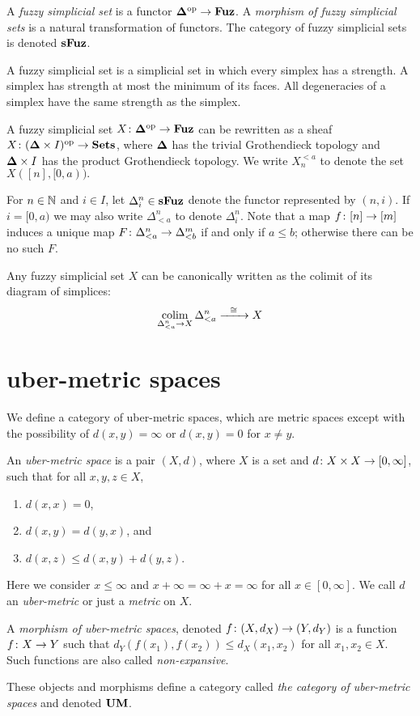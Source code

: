 \documentclass{amsart}
\def\UM{{\bf UM}}
\def\bD{{\bf \Delta}}
\def\Fuz{{\bf Fuz}}
\def\sFuz{{\bf sFuz}}
\begin{document}
\begin{definition}

A {\em fuzzy simplicial set} is a functor $\bD\op\to\Fuz$.  A {\em morphism of fuzzy simplicial sets} is a natural transformation of functors.   The category of fuzzy simplicial sets is denoted $\sFuz$.

\end{definition}

A fuzzy simplicial set is a simplicial set in which every simplex has a strength.  A simplex has strength at most the minimum of its faces.  All degeneracies of a simplex have the same strength as the simplex.

A fuzzy simplicial set $X\taking\bD\op\to\Fuz$ can be rewritten as a sheaf $X\taking(\bD\cross I)\op\to\Sets$, where $\bD$ has the trivial Grothendieck topology and $\bD\cross I$ has the product Grothendieck topology.  We write $X_n^{<a}$ to denote the set $X([n],[0,a)).$

For $n\in{\mathbb N}$ and $i\in I$, let $\Delta^n_i\in\sFuz$ denote the functor represented by $(n,i)$.  If $i=[0,a)$  we may also write $\Delta^n_{<a}$ to denote $\Delta^n_i$.  Note that a map $f\colon[n]\rightarrow[m]$ induces a unique map $F\colon\Delta^n_{<a}\rightarrow\Delta^m_{<b}$ if and only if $a\leq b$; otherwise there can be no such $F$.

Any fuzzy simplicial set $X$ can be canonically written as the colimit of its diagram of simplices: $$\mathop{\textnormal{colim}}_{\Delta^n_{<a}\rightarrow X}\Delta^n_{<a}\xrightarrow{\ \ \cong\ \ } X$$


\section{uber-metric spaces}

We define a category of uber-metric spaces, which are metric spaces except with the possibility of $d(x,y)=\infty$ or $d(x,y)=0$ for $x\neq y$.

\begin{definition}

An {\em uber-metric space} is a pair $(X,d)$, where $X$ is a set and $d\colon X\times X\rightarrow [0,\infty]$, such that for all $x,y,z\in X$, \begin{enumerate}\item $d(x,x)=0$,\item $d(x,y)=d(y,x)$, and\item $d(x,z)\leq d(x,y)+d(y,z)$.\end{enumerate}  Here we consider $x\leq\infty$ and $x+\infty=\infty+x=\infty$ for all $x\in [0,\infty]$.  We call $d$ an {\em uber-metric} or just a {\em metric} on $X$.

A {\em morphism of uber-metric spaces}, denoted $f\colon (X,d_X)\rightarrow (Y,d_Y)$ is a function $f\colon X\rightarrow Y$ such that $d_Y(f(x_1),f(x_2))\leq d_X(x_1,x_2)$ for all $x_1,x_2\in X$.  Such functions are also called {\em non-expansive}.

These objects and morphisms define a category called {\em the category of uber-metric spaces} and denoted $\UM$.

\end{definition}
\end{document}
